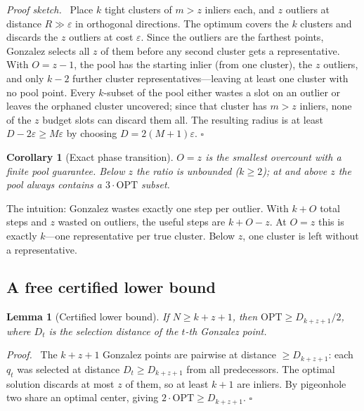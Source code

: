 \documentclass{siam}
\newtheorem{lemma}{Lemma}
\newtheorem{corollary}{Corollary}
\newenvironment{proof}[1][Proof]{\noindent\textit{#1.}\ }%
    {\hfill$\square$\par\medskip}%
\newcommand{\OPT}{\mathrm{OPT}}
\begin{document}
\begin{proof}[Proof sketch]
Place $k$ tight clusters of $m>z$ inliers each, and $z$ outliers at
distance $R\gg\varepsilon$ in orthogonal directions. The optimum covers
the $k$ clusters and discards the $z$ outliers at cost $\varepsilon$.
Since the outliers are the farthest points, Gonzalez selects all $z$
of them before any second cluster gets a representative. With $O=z-1$,
the pool has the starting inlier (from one cluster), the $z$ outliers,
and only $k-2$ further cluster representatives---leaving at least one
cluster with no pool point. Every $k$-subset of the pool either wastes
a slot on an outlier or leaves the orphaned cluster uncovered; since
that cluster has $m>z$ inliers, none of the $z$ budget slots can
discard them all. The resulting radius is at least $D-2\varepsilon\ge
M\varepsilon$ by choosing $D=2(M{+}1)\varepsilon$.
\end{proof}

\begin{corollary}[Exact phase transition]
\label{cor:phase}
$O=z$ is the smallest overcount with a finite pool guarantee. Below
$z$ the ratio is unbounded ($k\ge 2$); at and above $z$ the pool
always contains a $3\cdot\OPT$ subset.
\end{corollary}

The intuition: Gonzalez wastes exactly one step per outlier. With
$k+O$ total steps and $z$ wasted on outliers, the useful steps are
$k+O-z$. At $O=z$ this is exactly $k$---one representative per true
cluster. Below $z$, one cluster is left without a representative.

\subsection{A free certified lower bound}

\begin{lemma}[Certified lower bound]
\label{lem:cert}
If $N\ge k{+}z{+}1$, then $\OPT\ge D_{k+z+1}/2$, where $D_t$ is the
selection distance of the $t$-th Gonzalez point.
\end{lemma}

\begin{proof}
The $k+z+1$ Gonzalez points are pairwise at distance $\ge D_{k+z+1}$:
each $q_t$ was selected at distance $D_t\ge D_{k+z+1}$ from all
predecessors. The optimal solution discards at most $z$ of them, so
at least $k+1$ are inliers. By pigeonhole two share an optimal center,
giving $2\cdot\OPT\ge D_{k+z+1}$.
\end{proof}
\end{document}
